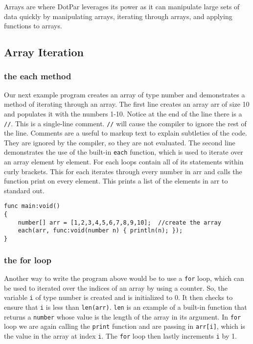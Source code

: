 Arrays are where DotPar leverages its power as it can manipulate large sets of data quickly by manipulating arrays, iterating through arrays, and applying functions to arrays. 

\subsection{Array Iteration}
\subsubsection{the each method}
Our next example program creates an array of type number and demonstrates a method of iterating through an array. The first line creates an array arr of size 10 and populates it with the numbers 1-10. Notice at the end of the line there is a \verb=//=. This is a single-line comment. \verb=//= will cause the compiler to ignore the rest of the line. Comments are a useful to markup text to explain subtleties of the code. They are ignored by the compiler, so they are not evaluated. The second line demonstrates the use of the built-in \verb=each= function, which is used to iterate over an array element by element. For each loops contain all of its statements within curly brackets.  This for each iterates through every number in arr and calls the function print on every element. This prints a list of the elements in arr to standard out.

\begin{verbatim}
func main:void()
{
    number[] arr = [1,2,3,4,5,6,7,8,9,10];  //create the array
    each(arr, func:void(number n) { println(n); });
}
\end{verbatim}

\subsubsection{the for loop}
Another way to write the program above would be to use a \verb=for= loop, which can be used to iterated over the indices of an array by using a counter. So, the variable \verb=i= of type number is created and is initialized to 0. It then checks to ensure that \verb=i= is less than \verb=len(arr)=. \verb=len= is an example of a built-in function that returns a \verb=number= whose value is the length of the array in its argument. In \verb=for= loop we are again calling the \verb=print= function and are passing in \verb=arr[i]=, which is the value in the array at index \verb=i=. The \verb=for= loop then lastly increments \verb=i= by 1.

